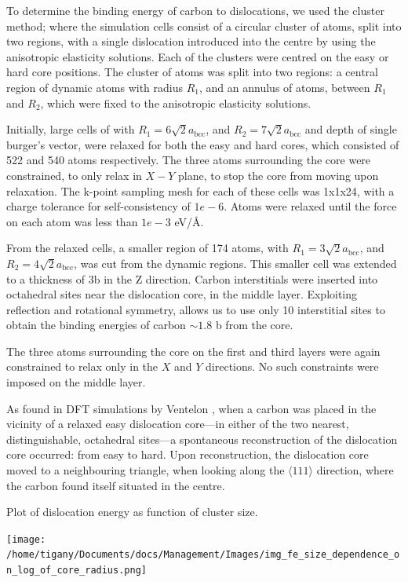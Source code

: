 \documentclass[a4paper]{article}
\begin{document}
To determine the binding energy of carbon to dislocations, we used the
cluster method; where the simulation cells consist of a circular cluster of
atoms, split into two regions, with a single dislocation introduced into the
centre by using the anisotropic elasticity solutions. Each of the clusters
were centred on the easy or hard core positions. The cluster of atoms was
split into two regions: a central region of dynamic atoms with radius \(R_1\),
and an annulus of atoms, between \(R_1\) and \(R_2\), which were fixed to the anisotropic
elasticity solutions. 

Initially, large cells of with \(R_1 = 6\sqrt{2}a_{\text{bcc}}\), and \(R_2 =
   7\sqrt{2}a_{\text{bcc}}\) and depth of single burger's vector, were relaxed
for both the easy and hard cores, which consisted of 522 and 540 atoms
respectively. The three atoms surrounding the core were constrained, to only
relax in \(X-Y\) plane, to stop the core from moving upon relaxation. The
k-point sampling mesh for each of these cells was 1x1x24, with a charge
tolerance for self-consistency of \(1e-6\). Atoms were relaxed until the force
on each atom was less than \(1e-3\) eV/\AA{}.  

From the relaxed cells, a smaller region of 174 atoms, with \(R_1 =
   3\sqrt{2}a_{\text{bcc}}\), and \(R_2 = 4\sqrt{2}a_{\text{bcc}}\), was cut from
the dynamic regions. This smaller cell was extended to a thickness of 3b in
the Z direction. Carbon interstitials were inserted into octahedral sites
near the dislocation core, in the middle layer. Exploiting reflection and
rotational symmetry, allows us to use only 10 interstitial
sites to obtain the binding energies of carbon \(\sim 1.8\) b from the core. 

The three atoms surrounding the core on the first and third layers were again
constrained to relax only in the \(X\) and \(Y\) directions. No such constraints
were imposed on the middle layer. 


As found in DFT simulations by Ventelon \cite{Ventelon2015}, when a carbon was placed in the
vicinity of a relaxed easy dislocation core---in either of the two nearest, distinguishable,
octahedral sites---a spontaneous reconstruction of the dislocation core occurred: from easy to
hard. Upon reconstruction, the dislocation core moved to a neighbouring triangle, when looking along the \(\langle
   111\rangle\) direction, where the carbon found itself situated in the centre.


Plot of dislocation energy as function of cluster size. 
\begin{center}
\texttt{[image: /home/tigany/Documents/docs/Management/Images/img\_fe\_size\_dependence\_on\_log\_of\_core\_radius.png]}
\end{center}
\end{document}
